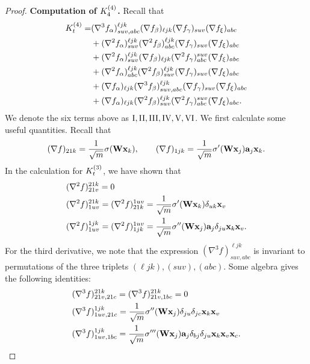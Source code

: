 \begin{proof}
	{\bf Computation of ${K}^{(4)}_4$.} Recall that
	\begin{align*}
		{K}^{(4)}_t = &   (\nabla^3 f_\alpha)^{\ell j k }_{suv, abc} (\nabla f_\beta)_{\ell j k} (\nabla f_\gamma)_{suv} (\nabla f_\xi)_{abc}\\
		& + (\nabla^2 f_\alpha)^{\ell j k }_{suv} (\nabla^2 f_\beta)^{\ell j k}_{abc} (\nabla f_\gamma)_{suv} (\nabla f_\xi)_{abc} \\
		& + (\nabla^2 f_\alpha)^{\ell j k }_{suv} (\nabla f_\beta)_{\ell j k} (\nabla^2 f_\gamma)^{suv}_{abc} (\nabla f_\xi)_{abc} \\
		& +  (\nabla^2 f_\alpha)^{\ell j k }_{abc} (\nabla^2 f_\beta)^{\ell j k}_{s u v} (\nabla f_\gamma)_{suv}  (\nabla f_\xi)_{abc} \\
		& +  (\nabla f_\alpha)_{\ell j k } (\nabla^3 f_\beta)^{\ell j k}_{s u v, abc} (\nabla f_\gamma)_{suv} (\nabla f_\xi)_{abc} \\
		& +  (\nabla f_\alpha)_{\ell j k } (\nabla^2 f_\beta)^{\ell j k}_{s u v} (\nabla^2 f_\gamma)^{suv}_{abc}  (\nabla f_\xi)_{abc}.
	\end{align*}
	We denote the six terms above as $\RN{1}, \RN{2}, \RN{3}, \RN{4}, \RN{5}, \RN{6}$.
	We first calculate some useful quantities. Recall that
	\[
		(\nabla f)_{21k} = \frac{1}{\sqrt{m}} \sigma({\mathbf{W}} {\mathbf{x}}_k), \qquad (\nabla f)_{1jk} = \frac{1}{\sqrt{m}} \sigma'({\mathbf{W}}  {\mathbf{x}}_j) {\mathbf{a}}_j{\mathbf{x}}_k.
	\]
	In the calculation for ${K}^{(3)}_t$, we have shown that
	\begin{align*}
		& (\nabla^2 f)^{2 1 k}_{2 1v}   = 0 \\
		& (\nabla^2 f)^{2 1 k}_{1 u v} = (\nabla^2 f)^{1 u v}_{2 1 k} = \frac{1}{\sqrt{m}} \sigma'({\mathbf{W}}  {\mathbf{x}}_k) \delta_{uk}{\mathbf{x}}_v \\
		& (\nabla^2 f)^{1 j k}_{1 u v} =(\nabla^2 f)^{1 u v}_{1 j k } = \frac{1}{\sqrt{m}} \sigma''({\mathbf{W}}  {\mathbf{x}}_j) {\mathbf{a}}_j \delta_{ju}{\mathbf{x}}_k{\mathbf{x}}_v.
	\end{align*}
	For the third derivative, we note that the expression $(\nabla^3 f)^{\ell j k}_{suv, abc}$ is invariant to permutations of the three triplets $(\ell j k), (s u v), (a b c)$. Some algebra gives the following identities:
	\begin{align*}
		& (\nabla^3 f)^{2 1 k}_{2 1 v, 21 c} = (\nabla^3 f)^{2 1 k}_{2 1 v, 1 b c} = 0\\
		& (\nabla^3 f)^{1 j k}_{1 u v, 2 1 c} =  \frac{1}{\sqrt{m}} \sigma''(\rmW  \rvx_j) \delta_{ju} \delta_{jc}\rvx_k\rvx_v \\
		& (\nabla^3 f)^{1 j k}_{1 u v, 1 b c}= \frac{1}{\sqrt{m}} \sigma'''(\rmW  \rvx_j )\rva_j \delta_{bj}\delta_{ju}\rvx_k\rvx_v \rvx_c.

\end{align*}
\end{proof}
